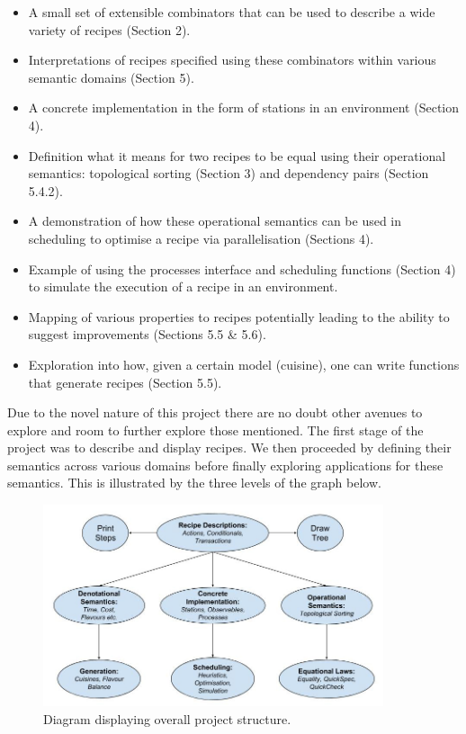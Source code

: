 \documentclass[11pt]{article}
\begin{document}
\begin{itemize}
    \item A small set of extensible combinators that can be used to describe a wide variety of recipes (Section 2).

    \item Interpretations of recipes specified using these combinators within various semantic domains (Section 5).

    \item A concrete implementation in the form of stations in an environment (Section 4).

    \item Definition what it means for two recipes to be equal using their operational semantics:
    topological sorting (Section 3) and dependency pairs (Section 5.4.2).

    \item A demonstration of how these operational semantics can be used in scheduling to optimise
    a recipe via parallelisation (Sections 4).

    \item Example of using the processes interface and scheduling functions (Section 4) to
    simulate the execution of a recipe in an environment.

    \item Mapping of various properties to recipes potentially leading to the ability
    to suggest improvements (Sections 5.5 \& 5.6).

    \item Exploration into how, given a certain model (cuisine), one can write functions that
    generate recipes (Section 5.5).
\end{itemize}

Due to the novel nature of this project there are no doubt other avenues to explore and
room to further explore those mentioned. The first stage of the project was to describe
and display recipes. We then proceeded by defining their semantics across various domains
before finally exploring applications for these semantics. This is illustrated by the
three levels of the graph below.

\begin{figure}[h]
\includegraphics[width=10cm, keepaspectratio]{project.jpg}
\centering
\caption{Diagram displaying overall project structure.}
\end{figure}
\end{document}
